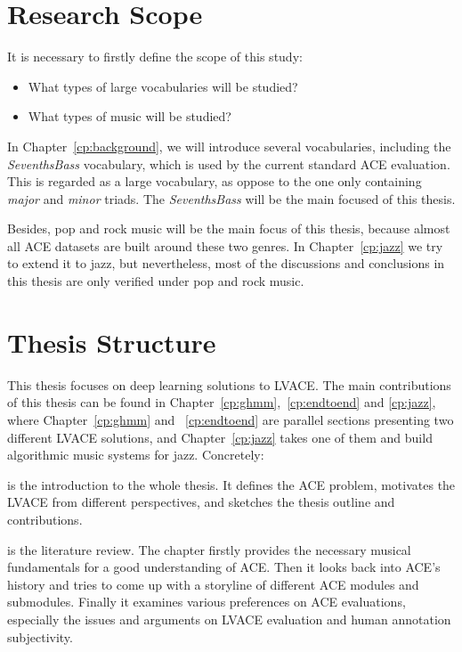 \section{Research Scope} \label{sec:1-scope}
\noindent
It is necessary to firstly define the scope of this study:
\begin{itemize}
	\item What types of large vocabularies will be studied?
	\item What types of music will be studied?
\end{itemize}
In Chapter~\ref{cp:background}, we will introduce several vocabularies, including the \textit{SeventhsBass} vocabulary, which is used by the current standard ACE evaluation. This is regarded as a large vocabulary, as oppose to the one only containing \textit{major} and \textit{minor} triads. The \textit{SeventhsBass} will be the main focused of this thesis.

Besides, pop and rock music will be the main focus of this thesis, because almost all ACE datasets are built around these two genres. In Chapter~\ref{cp:jazz} we try to extend it to jazz, but nevertheless, most of the discussions and conclusions in this thesis are only verified under pop and rock music.

\section{Thesis Structure} \label{sec:1-outline}
This thesis focuses on deep learning solutions to LVACE. The main contributions of this thesis can be found in Chapter~\ref{cp:ghmm},~\ref{cp:endtoend} and \ref{cp:jazz}, where Chapter~\ref{cp:ghmm} and ~\ref{cp:endtoend} are parallel sections presenting two different LVACE solutions, and Chapter~\ref{cp:jazz} takes one of them and build algorithmic music systems for jazz. Concretely:

 is the introduction to the whole thesis. It defines the ACE problem, motivates the LVACE from different perspectives, and sketches the thesis outline and contributions.

 is the literature review. The chapter firstly provides the necessary musical fundamentals for a good understanding of ACE. Then it looks back into ACE's history and tries to come up with a storyline of different ACE modules and submodules. Finally it examines various preferences on ACE evaluations, especially the issues and arguments on LVACE evaluation and human annotation subjectivity.

